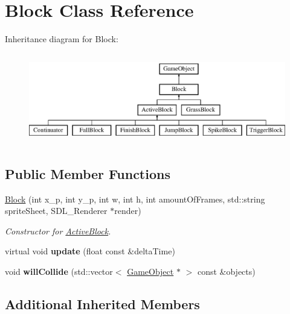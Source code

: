 \hypertarget{class_block}{}\section{Block Class Reference}
\label{class_block}
Inheritance diagram for Block\+:\begin{figure}[H]
\begin{center}
\leavevmode
\includegraphics[height=4.000000cm]{class_block}
\end{center}
\end{figure}
\subsection*{Public Member Functions}
\begin{DoxyCompactItemize}
\item 
\hyperlink{class_block_afb6f1b926a0fc4d9024c101e40744ef5}{Block} (int x\+\_\+p, int y\+\_\+p, int w, int h, int amount\+Of\+Frames, std\+::string sprite\+Sheet, S\+D\+L\+\_\+\+Renderer $\ast$render)
\begin{DoxyCompactList}\small\item\em Constructor for \hyperlink{class_active_block}{Active\+Block}. \end{DoxyCompactList}\item 
\hypertarget{class_block_a7c02e05afb37da80875f17778916d6e5}{}virtual void {\bfseries update} (float const \&delta\+Time)\label{class_block_a7c02e05afb37da80875f17778916d6e5}

\item 
\hypertarget{class_block_a109153c2792ff5b4358bf3d39eb7132b}{}void {\bfseries will\+Collide} (std\+::vector$<$ \hyperlink{class_game_object}{Game\+Object} $\ast$ $>$ const \&objects)\label{class_block_a109153c2792ff5b4358bf3d39eb7132b}

\end{DoxyCompactItemize}
\subsection*{Additional Inherited Members}


